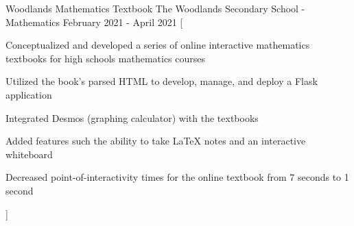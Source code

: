 

\begin{cventries}

  \cventry
    {Woodlands Mathematics Textbook} %
    {The Woodlands Secondary School - Mathematics} %
    {} %
    {February 2021 - April 2021} %
    [
      \begin{cvitems} %
        \item {Conceptualized and developed a series of online interactive mathematics textbooks for high schools mathematics courses}
        \item {Utilized the book's parsed HTML to develop, manage, and deploy a Flask application}
        \item {Integrated Desmos (graphing calculator) with the textbooks}
        \item {Added features such the ability to take LaTeX notes and an interactive whiteboard}
        \item {Decreased point-of-interactivity times for the online textbook from 7 seconds to 1 second}
      \end{cvitems}
    ]

\end{cventries}
